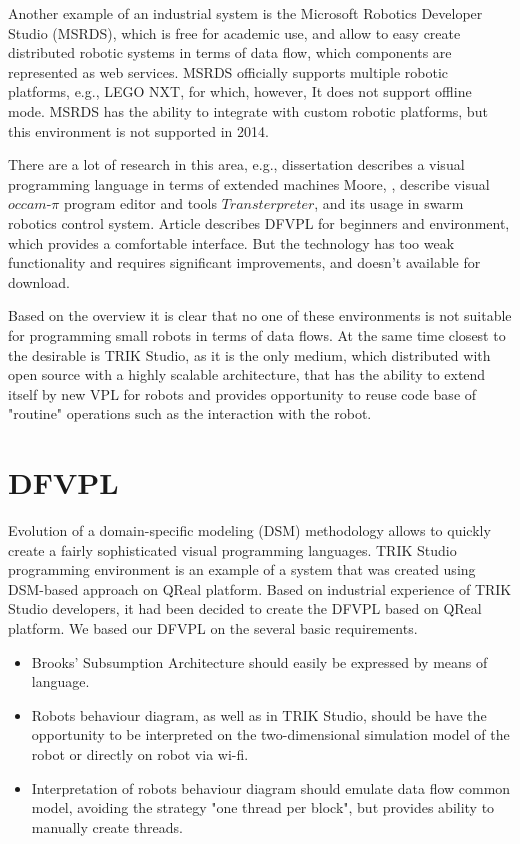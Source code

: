 \documentclass[conference,compsoc]{IEEEtran}
\begin{document}
Another example of an industrial system is the Microsoft Robotics Developer Studio (MSRDS)\cite{jackson2007microsoft}, which is free for academic use, and allow to easy create distributed robotic systems in terms of data flow, which components are represented as web services. MSRDS officially supports multiple robotic platforms, e.g., LEGO NXT\cite{kim2007programming}, for which, however, It does not support offline mode. MSRDS has the ability to integrate with  custom robotic platforms, but this environment is not supported in 2014.

There are a lot of research in this area, e.g., dissertation\cite{banyasad2000visual} describes a visual programming language in terms of extended machines Moore, \cite{simpson2008visual},\cite{posso2011process} describe visual $occam\mbox{-}\pi$ program editor and tools $Transterpreter$, and its usage in swarm robotics control system. Article\cite{diprose2011ruru} describes DFVPL for beginners and environment, which provides a comfortable interface. But the technology has too weak functionality and requires significant improvements, and doesn't available for download.

Based on the overview it is clear that no one of these environments is not suitable for programming small robots in terms of data flows. At the same time closest to the desirable is TRIK Studio, as it is the only medium, which distributed with open source with a highly scalable architecture, that has the ability to extend itself by new VPL for robots and provides opportunity to reuse code base of "routine" operations such as the interaction with the robot.



\section{DFVPL}
\label{sec:lang}
Evolution of a domain-specific modeling (DSM) methodology allows to quickly create a fairly sophisticated visual programming languages\cite{DSM}. TRIK Studio programming environment is an example of a system that was created using DSM-based approach on QReal platform\cite{qrealMeta, kuzenkova2013qreal}. Based on industrial experience of TRIK Studio developers, it had been decided to create the DFVPL based on QReal platform. We based our DFVPL on the several basic requirements.

\begin{itemize}
\item Brooks’ Subsumption Architecture should easily be expressed by means of language.
\item Robots behaviour diagram, as well as in TRIK Studio, should be have the opportunity to be interpreted on the two-dimensional simulation model of the robot or directly on robot via wi-fi.
\item Interpretation  of robots behaviour diagram  should emulate data flow common model, avoiding the strategy "one thread per block", but provides ability to manually create threads.
\end{itemize}
\end{document}
